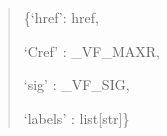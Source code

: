 \documentclass[letterpaper,10pt,english]{sphinxmanual}
\begin{document}
\begin{fulllineitems}
\begin{description}
\begin{quote}
\begin{description}
\end{description}\end{quote}

\item[{Returns:}] \leavevmode\begin{quote}\begin{description}
\item[{pcolorshift}] \leavevmode
\begin{DUlineblock}{0em}
\item[] \{‘href’: href,
\item[]
\begin{DUlineblock}{\DUlineblockindent}
\item[] ‘Cref’ : \_VF\_MAXR, 
\item[] ‘sig’ : \_VF\_SIG, 
\item[] ‘labels’ : list{[}str{]}\}
\end{DUlineblock}
\end{DUlineblock}

\end{description}\end{quote}

\end{description}

\end{fulllineitems}

\end{document}
